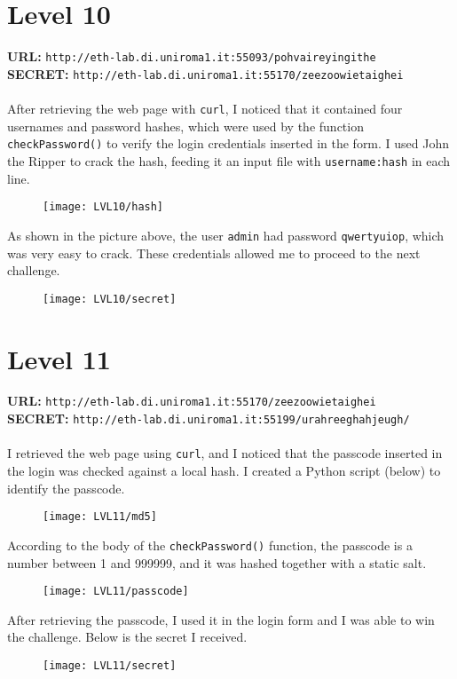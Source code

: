 \documentclass[12pt,a4paper]{article}
\begin{document}
	\section*{Level 10}
	\textbf{URL: }\texttt{http://eth-lab.di.uniroma1.it:55093/pohvaireyingithe}\\
	\textbf{SECRET: }\texttt{http://eth-lab.di.uniroma1.it:55170/zeezoowietaighei}\\\\
	After retrieving the web page with \texttt{curl}, I noticed that it contained four usernames and password hashes, which were used by the function \texttt{checkPassword()} to verify the login credentials inserted in the form. I used John the Ripper to crack the hash, feeding it an input file with \texttt{username:hash} in each line.\begin{figure}[H]
		\centering
		\texttt{[image: LVL10/hash]}
		\label{fig:john}
	\end{figure}As shown in the picture above, the user \texttt{admin} had password \texttt{qwertyuiop}, which was very easy to crack. These credentials allowed me to proceed to the next challenge.
	\begin{figure}[H]
		\centering
		\texttt{[image: LVL10/secret]}
		\label{fig:secret10}
	\end{figure} 	

	\section*{Level 11}
	\textbf{URL: }\texttt{http://eth-lab.di.uniroma1.it:55170/zeezoowietaighei}\\
	\textbf{SECRET: }\texttt{http://eth-lab.di.uniroma1.it:55199/urahreeghahjeugh/}\\\\
	I retrieved the web page using \texttt{curl}, and I noticed that the passcode inserted in the login was checked against a local hash. I created a Python script (below) to identify the passcode.
	\begin{figure}[H]
		\centering
		\texttt{[image: LVL11/md5]}
		\label{fig:md5}
	\end{figure}
According to the body of the \texttt{checkPassword()} function, the passcode is a number between 1 and 999999, and it was hashed together with a static salt.
	\begin{figure}[H]
		\centering
		\texttt{[image: LVL11/passcode]}
		\label{fig:foundhash}
	\end{figure}
After retrieving the passcode, I used it in the login form and I was able to win the challenge. Below is the secret I received.
	\begin{figure}[H]
		\centering
		\texttt{[image: LVL11/secret]}
		\label{fig:secret11}
	\end{figure}
\end{document}

